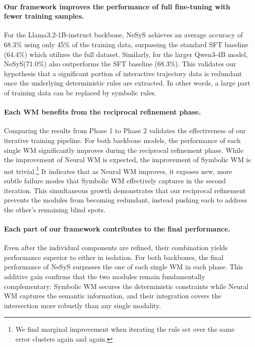 \documentclass{article}
\theoremstyle{plain}
\theoremstyle{definition}
\theoremstyle{remark}
\newcommand{\ours}{{\sc NeSyS}\xspace}
\begin{document}
\paragraph{Our framework improves the performance of full fine-tuning with fewer training samples.} For the Llama3.2-1B-instruct backbone, \ours achieves an average accuracy of 68.3\% using only 45\% of the training data, surpassing the standard SFT baseline (64.4\%) which utilizes the full dataset. Similarly, for the larger Qwen3-4B model, \ours (71.0\%) also outperforms the SFT baseline (68.3\%). This validates our hypothesis that a significant portion of interactive trajectory data is redundant once the underlying deterministic rules are extracted. In other words, a large part of training data can be replaced by symbolic rules.

\paragraph{Each WM benefits from the reciprocal refinement phase.} Comparing the results from Phase 1 to Phase 2 validates the effectiveness of our iterative training pipeline. For both backbone models, the performance of each single WM significantly improves during the reciprocal refinement phase. While the improvement of Neural WM is expected, the improvement of Symbolic WM is not trivial.\footnote{We find marginal improvement when iterating the rule set over the same error clusters again and again.} It indicates that as Neural WM improves, it exposes new, more subtle failure modes that Symbolic WM effectively captures in the second iteration. This simultaneous growth demonstrates that our reciprocal refinement prevents the modules from becoming redundant, instead pushing each to address the other's remaining blind spots.

\paragraph{Each part of our framework contributes to the final performance.} Even after the individual components are refined, their combination yields performance superior to either in isolation. For both backbones, the final performance of \ours surpasses the one of each single WM in each phase. This additive gain confirms that the two modules remain fundamentally complementary: Symbolic WM secures the deterministic constraints while Neural WM captures the semantic information, and their integration covers the intersection more robustly than any single modality.
\end{document}
